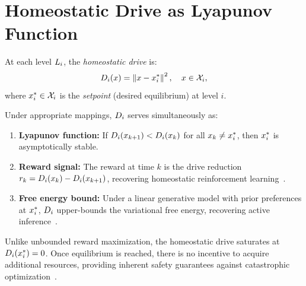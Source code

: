 \documentclass[11pt,a4paper]{article}
\begin{document}
\section{Homeostatic Drive as Lyapunov Function}
\label{sec:drive}

\begin{definition}
\label{def:drive}
At each level $L_{i}$, the \emph{homeostatic drive} is:
\begin{equation}
  D_{i}(x) = \left\| x - x^*_{i} \right\|^2, \quad x \in \mathcal{X}_i,
\end{equation}
where $x^*_{i} \in \mathcal{X}_i$ is the \emph{setpoint} (desired equilibrium) at
level $i$.
\end{definition}

\begin{proposition}
\label{prop:triple}
Under appropriate mappings, $D_{i}$ serves simultaneously as:
\begin{enumerate}
  \item \textbf{Lyapunov function:} If $D_{i}(x_{k+1}) < D_{i}(x_k)$
        for all $x_k \neq x^*_{i}$, then $x^*_{i}$ is asymptotically
        stable.
  \item \textbf{Reward signal:} The reward at time $k$ is the drive reduction
        $r_k = D_{i}(x_k) - D_{i}(x_{k+1})$, recovering homeostatic
        reinforcement learning~\cite{keramati2014homeostatic}.
  \item \textbf{Free energy bound:} Under a linear generative model with
        prior preferences at $x^*_{i}$, $D_{i}$ upper-bounds the
        variational free energy, recovering active
        inference~\cite{friston2009reinforcement, baltieri2019pid}.
\end{enumerate}
\end{proposition}

\begin{remark}
Unlike unbounded reward maximization, the homeostatic drive saturates at
$D_{i}(x^*_{i}) = 0$.  Once equilibrium is reached, there is no
incentive to acquire additional resources, providing inherent safety
guarantees against catastrophic optimization~\cite{mineault2024neuroai}.
\end{remark}


\end{document}
